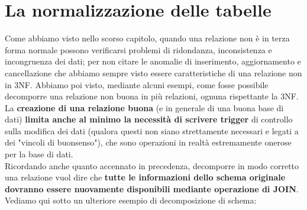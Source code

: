 \documentclass[12pt]{report}
\begin{document}
	\chapter{La normalizzazione delle tabelle}
	Come abbiamo visto nello scorso capitolo, quando una relazione non è in terza forma normale possono verificarsi problemi di ridondanza, inconsistenza e incongruenza dei dati; per non citare le anomalie di inserimento, aggiornamento e cancellazione che abbiamo sempre visto essere caratteristiche di una relazione non in 3NF. Abbiamo poi visto, mediante alcuni esempi, come fosse possibile decomporre una relazione non buona in più relazioni, ognuna rispettante la 3NF. La \textbf{creazione di una relazione buona} (e in generale di una buona base di dati) \textbf{limita anche al minimo la necessità di scrivere trigger} di controllo sulla modifica dei dati (qualora questi non siano strettamente necessari e legati a dei "vincoli di buonsenso"), che sono operazioni in realtà estremamente onerose per la base di dati.\\
	Ricordando anche quanto accennato in precedenza, decomporre in modo corretto una relazione vuol dire che \textbf{tutte le informazioni dello schema originale dovranno essere nuovamente disponibili mediante operazione di JOIN}.\\
	Vediamo qui sotto un ulteriore esempio di decomposizione di schema:
\end{document}
